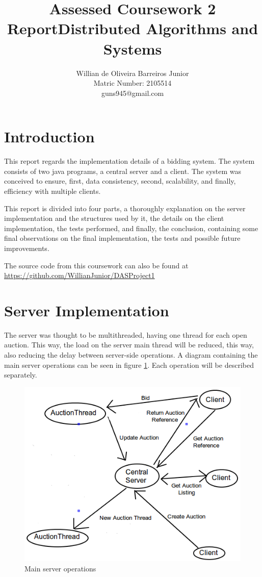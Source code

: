 \documentclass[twocolumn,10pt]{article}
\title{Assessed Coursework 2 Report\linebreak Distributed Algorithms and Systems}
\author{Willian de Oliveira Barreiros Junior\\
Matric Number: 2105514\\
 guns945@gmail.com\\}
\begin{document}
\maketitle

\section{Introduction}
This report regards the implementation details of a bidding system. The system consists of two java programs, a central server and a client. The system was conceived to ensure, first, data consistency, second, scalability, and finally, efficiency with multiple clients.

This report is divided into four parts, a thoroughly explanation on the server implementation and the structures used by it, the details on the client implementation, the tests performed, and finally, the conclusion, containing some final observations on the final implementation, the tests and possible future improvements.

The source code from this coursework can also be found at
\url{https://github.com/WillianJunior/DASProject1}

\section{Server Implementation}
The server was thought to be multithreaded, having one thread for each open auction. This way, the load on the server main thread will be reduced, this way, also reducing the delay between server-side operations. A diagram containing the main server operations can be seen in figure \ref{fig:diag}. Each operation will be described separately.

\begin{figure}[h]
\centering
\includegraphics[scale=0.4]{diagram.png}
\caption{Main server operations}
\label{fig:diag}
\end{figure}
\end{document}
